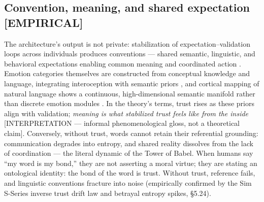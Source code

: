 \documentclass[11pt,twocolumn]{article}
\theoremstyle{plain}
\begin{document}
\subsection{Convention, meaning, and shared expectation [EMPIRICAL]}

The architecture's output is not private: stabilization of expectation–validation loops across individuals produces conventions — shared semantic, linguistic, and behavioral expectations enabling common meaning and coordinated action \citep{lewis1969,grice1975}. Emotion categories themselves are constructed from conceptual knowledge and language, integrating interoception with semantic priors \citep{piaget1952,barrett2017a}, and cortical mapping of natural language shows a continuous, high-dimensional semantic manifold rather than discrete emotion modules \citep{huth2016,lindquist2012}. In the theory's terms, trust rises as these priors align with validation; \emph{meaning is what stabilized trust feels like from the inside} [INTERPRETATION --- informal phenomenological gloss, not a theoretical claim]. Conversely, without trust, words cannot retain their referential grounding: communication degrades into entropy, and shared reality dissolves from the lack of coordination --- the literal dynamic of the Tower of Babel. When humans say ``my word is my bond,'' they are not asserting a moral virtue; they are stating an ontological identity: the bond of the word is trust. Without trust, reference fails, and linguistic conventions fracture into noise (empirically confirmed by the Sim S-Series inverse trust drift law and betrayal entropy spikes, \S{}5.24).
\end{document}
